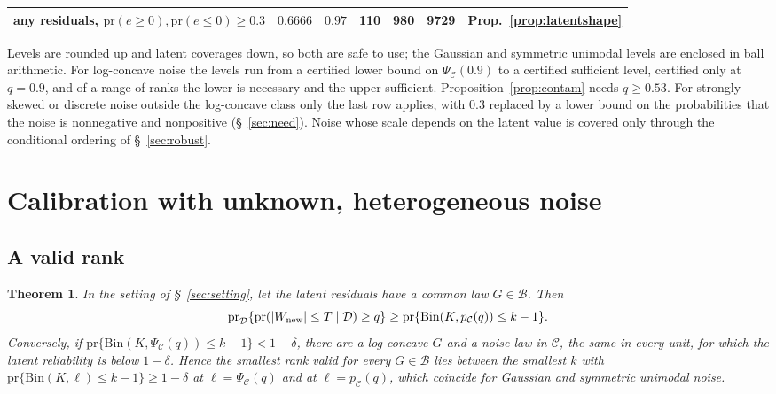 \documentclass[12pt]{article}
\newtheorem{theorem}{Theorem}
\theoremstyle{definition}
\newcommand{\pr}{\mathrm{pr}}
\newcommand{\B}{\mathcal{B}}
\newcommand{\E}{\mathcal{C}}
\newcommand{\Bin}{\mathrm{Bin}}
\begin{document}
\begin{table}[htbp]
\begin{tabular}{p{3.6cm}cccccl}
any residuals, $\pr(e \ge 0), \pr(e \le 0) \ge 0.3$ & $0.6666$ & $0.97$ & 110 & 980 & 9729 & Prop.~\ref{prop:latentshape} \\
\bottomrule
\end{tabular}
\par\smallskip
\parbox{\textwidth}{\fontsize{8}{10pt}\selectfont Levels are rounded up and latent coverages down, so both are safe to use; the Gaussian and symmetric unimodal levels are enclosed in ball arithmetic. For log-concave noise the levels run from a certified lower bound on $\Psi_{\E}(0.9)$ to a certified sufficient level, certified only at $q = 0.9$, and of a range of ranks the lower is necessary and the upper sufficient. Proposition~\ref{prop:contam} needs $q \ge 0.53$. For strongly skewed or discrete noise outside the log-concave class only the last row applies, with $0.3$ replaced by a lower bound on the probabilities that the noise is nonnegative and nonpositive (\S~\ref{sec:need}). Noise whose scale depends on the latent value is covered only through the conditional ordering of \S~\ref{sec:robust}.}
\end{table}

\section{Calibration with unknown, heterogeneous noise}\label{sec:procedure}

\subsection{A valid rank}

\begin{theorem}\label{thm:rank}
In the setting of \S~\ref{sec:setting}, let the latent residuals have a common law $G \in \B$. Then
\[
\pr_{\mathcal D}\{\pr(|W_{\rm new}| \le T \mid \mathcal D) \ge q\} \ge \pr\{\Bin(K, p_{\E}(q)) \le k - 1\}.
\]
Conversely, if $\pr\{\Bin(K, \Psi_{\E}(q)) \le k - 1\} < 1 - \delta$, there are a log-concave $G$ and a noise law in $\E$, the same in every unit, for which the latent reliability is below $1 - \delta$. Hence the smallest rank valid for every $G \in \B$ lies between the smallest $k$ with $\pr\{\Bin(K, \ell) \le k - 1\} \ge 1 - \delta$ at $\ell = \Psi_{\E}(q)$ and at $\ell = p_{\E}(q)$, which coincide for Gaussian and symmetric unimodal noise.
\end{theorem}
\end{document}
